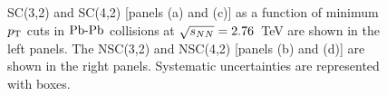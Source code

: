 \begin{figure}[t!]
	\begin{center}
        \caption{SC(3,2) and SC(4,2) [panels (a) and (c)] as a function of minimum $p_{\rm T}$ cuts in $\textnormal{Pb-Pb}$ collisions at $\sqrt{s_{NN}}=2.76$~TeV are shown in the left panels. The NSC(3,2) and NSC(4,2) [panels (b) and (d)] are shown in the right panels. Systematic uncertainties are represented with boxes.}         \label{fig:Figure_2}
        \end{center}   
\end{figure}


